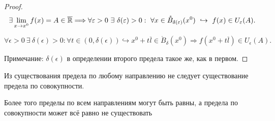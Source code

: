\begin{proof}
    $$\exists \lim_{x \to x^0} f(x) = A \in \overline{\mathbb{R}} \Longrightarrow    \forall \varepsilon > 0 \  \exists \  \delta(\varepsilon) > 0: \ \forall x \in \mathring{B}_{\delta(\varepsilon)}(x^0) \  \hookrightarrow \ f(x) \in U_{\varepsilon}(A).
    $$

    $$\forall \epsilon > 0 \  \exists \  \delta(\epsilon) > 0: \forall t \in (0, \delta(\epsilon)) \hookrightarrow x^0 + t \overline{l} \in \mathring{B}_{\delta}(x^0) \Longrightarrow f(x^0 + t \overline{l}) \in U_{\epsilon}(A).$$

    Примечание: $\delta(\epsilon)$ в определении второго предела такое же, как в первом.
\end{proof}


\begin{note}
    Из существования предела по любому направлению не следует существование предела по совокупности.

    Более того пределы по всем направлениям могут быть равны, а предела по совокупности может всё равно не существовать

\end{note}


